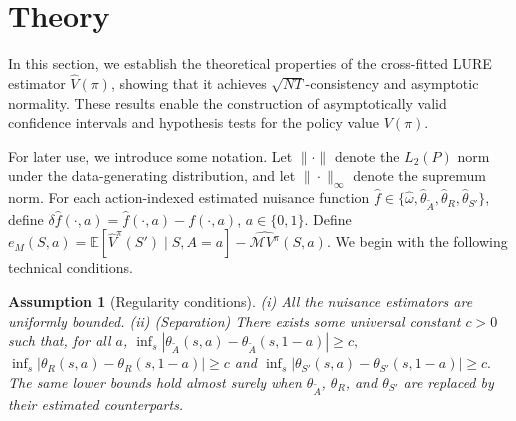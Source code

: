 \documentclass[12pt]{article}
\newcommand{\0}{\boldsymbol{0}}
\newtheorem{assumption}{Assumption}[section]
\newcommand{\E}{\mathbb{E}}
\begin{document}


\section{Theory} \label{sec: theory}

In this section, we establish the theoretical properties of the cross-fitted LURE estimator $\widehat V(\pi)$, showing that it achieves $\sqrt{NT}$-consistency and asymptotic normality. These results enable the construction of asymptotically valid confidence intervals and hypothesis tests for the policy value $V(\pi)$.



For later use, we introduce some notation. Let \(\|\cdot\|\) denote the \(L_2(P)\) norm under the data-generating distribution, and let \(\|\cdot\|_\infty\) denote the supremum norm. For each action-indexed estimated nuisance function
\(\widehat f\in\{\widehat\omega,\widehat\theta_{\widetilde A},\widehat\theta_R,\widehat\theta_{S'}\}\), define 
\(\delta \widehat f(\cdot,a)=\widehat f(\cdot,a)-f(\cdot,a)\), \(a\in\{0,1\}\).
Define $e_M(S,a)=\mathbb E[\widehat V^\pi(S')\mid S,A=a]-\widehat{\mathcal M V^{\pi}}(S,a).$ We begin with the following technical conditions.


\begin{assumption}[Regularity conditions]
\label{assump:regularity}
(i)  All the nuisance estimators are uniformly bounded. (ii) \textit{(Separation)}
There exists some universal constant \(c>0\) such that, for all $a$,
    $\inf_s\left|\theta_{\widetilde A}(s,a)-\theta_{\widetilde A}(s,1-a)\right|\ge c,$ $\inf_s\left|\theta_R(s,a)-\theta_R(s,1-a)\right|\ge c$ and $\inf_s\left|\theta_{S'}(s,a)-\theta_{S'}(s,1-a)\right|\ge c.$
The same lower bounds hold almost surely when \(\theta_{\widetilde A}\), \(\theta_R\), and \(\theta_{S'}\) are replaced by their estimated counterparts.

\end{assumption}
\end{document}
